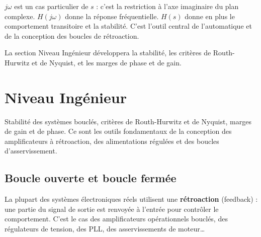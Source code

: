 \documentclass[12pt,a4paper,twoside]{book}
\begin{document}
\begin{intuition}
$j\omega$ est un cas particulier de $s$ : c'est la restriction à l'axe imaginaire du plan complexe. $H(j\omega)$ donne la réponse fréquentielle. $H(s)$ donne en plus le comportement transitoire et la stabilité. C'est l'outil central de l'automatique et de la conception des boucles de rétroaction.

La section Niveau Ingénieur développera la stabilité, les critères de Routh-Hurwitz et de Nyquist, et les marges de phase et de gain.
\end{intuition}


\section{Niveau Ingénieur}

\begin{ingenieur}
Stabilité des systèmes bouclés, critères de Routh-Hurwitz et de Nyquist, marges de gain et de phase. Ce sont les outils fondamentaux de la conception des amplificateurs à rétroaction, des alimentations régulées et des boucles d'asservissement.
\end{ingenieur}

\subsection{Boucle ouverte et boucle fermée}

La plupart des systèmes électroniques réels utilisent une \textbf{rétroaction} (feedback) : une partie du signal de sortie est renvoyée à l'entrée pour contrôler le comportement. C'est le cas des amplificateurs opérationnels bouclés, des régulateurs de tension, des PLL, des asservissements de moteur\ldots
\end{document}
